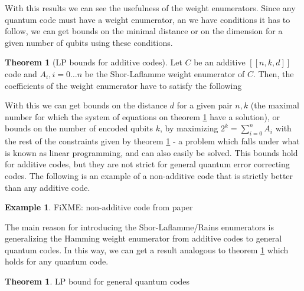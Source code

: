 \documentclass{article}
\theoremstyle{definition}
\newtheorem{theorem}[Satz]{Theorem}
\newtheorem{ex}[Satz]{Example}
\begin{document}
With this results we can see the usefulness of the weight enumerators. Since any quantum code must have a weight enumerator, an we have conditions it has to follow, we can get bounds on the minimal distance or on the dimension for a given number of qubits using these conditions.

\begin{theorem}[LP bounds for additive codes]\label{lpadditive}
Let $C$ be an additive $[[n,k,d]]$ code and $A_i, i = 0 \ldots n$ be the Shor-Laflamme weight enumerator of $C$. Then, the coefficients of the weight enumerator have to satisfy the following
\end{theorem}

With this we can get bounds on the distance $d$ for a given pair $n,k$ (the maximal number for which the system of equations on theorem \ref{lpadditive} have a solution), or bounds on the number of encoded qubits $k$, 
by maximizing $2^k = \sum_{i=0}^n A_i$ with the rest of the constraints given by theorem \ref{lpadditive} - a problem which falls under what is known as linear programming, and can also easily be solved.
This bounds hold for additive codes, but they are not strict for general quantum error correcting codes. The following is an example of a non-additive code that is strictly better than any additive code.

\begin{ex}
FiXME: non-additive code from paper
\end{ex}

The main reason for introducing the Shor-Laflamme/Rains enumerators is generalizing the Hamming weight enumerator from additive codes to general quantum codes. In this way, we can get a result analogous to theorem \ref{lpadditive} which holds for any quantum code. 

\begin{theorem}
LP bound for general quantum codes
\end{theorem}
\end{document}
